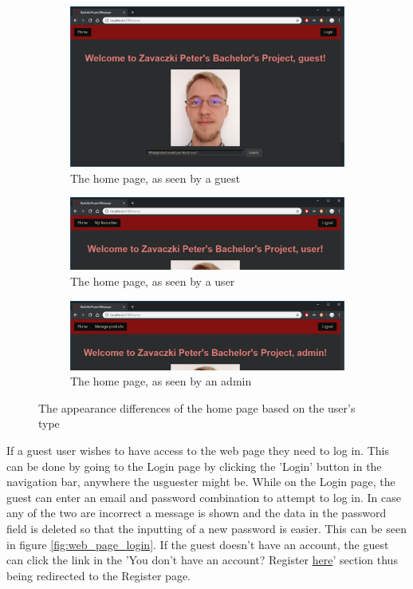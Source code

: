 \documentclass[12pt,a4paper,twoside]{report}
\begin{document}
\begin{figure}[ht]
  \centering
  \begin{subfigure}{\textwidth}
    \centering
    \includegraphics[width=0.75\linewidth]{img/web_page_home_guest.png}
    \caption[]{The home page, as seen by a guest}
    \label{fig:web_page_home_guest}
  \end{subfigure}
  \begin{subfigure}{\textwidth}
    \centering
    \includegraphics[width=0.75\linewidth]{img/web_page_home_user.png}
    \caption[]{The home page, as seen by a user}
    \label{fig:web_page_home_user}
  \end{subfigure}
  \begin{subfigure}{\textwidth}
    \centering
    \includegraphics[width=0.75\linewidth]{img/web_page_home_admin.png}
    \caption[]{The home page, as seen by an admin}
    \label{fig:web_page_home_admin}
  \end{subfigure}
  \caption{The appearance differences of the home page based on the user's type}
  \label{mfig:web_page_home_differences}
\end{figure}

If a guest user wishes to have access to the web page they need to log in. This can be done by going to the Login page by clicking the 'Login' button in the navigation bar, anywhere the usguester might be. While on the Login page, the guest can enter an email and password combination to attempt to log in. In case any of the two are incorrect a message is shown and the data in the password field is deleted so that the inputting of a new password is easier. This can be seen in figure \ref{fig:web_page_login}. If the guest doesn't have an account, the guest can click the link in the 'You don't have an account? Register \underline{here}' section thus being redirected to the Register page.
\end{document}
